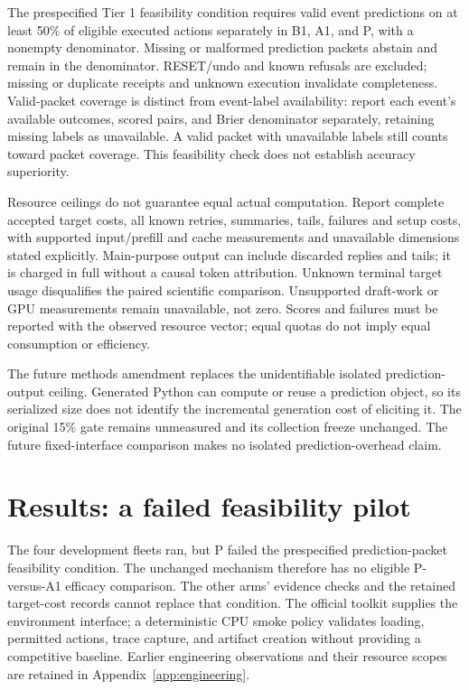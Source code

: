 \documentclass[11pt]{article}
\begin{document}
The prespecified Tier 1 feasibility condition requires valid event predictions on at least 50\% of eligible executed actions separately in B1, A1, and P, with a nonempty denominator. Missing or malformed prediction packets abstain and remain in the denominator. RESET/undo and known refusals are excluded; missing or duplicate receipts and unknown execution invalidate completeness. Valid-packet coverage is distinct from event-label availability: report each event's available outcomes, scored pairs, and Brier denominator separately, retaining missing labels as unavailable. A valid packet with unavailable labels still counts toward packet coverage. This feasibility check does not establish accuracy superiority.

Resource ceilings do not guarantee equal actual computation. Report complete accepted target costs, all known retries, summaries, tails, failures and setup costs, with supported input/prefill and cache measurements and unavailable dimensions stated explicitly. Main-purpose output can include discarded replies and tails; it is charged in full without a causal token attribution. Unknown terminal target usage disqualifies the paired scientific comparison. Unsupported draft-work or GPU measurements remain unavailable, not zero. Scores and failures must be reported with the observed resource vector; equal quotas do not imply equal consumption or efficiency.

The future methods amendment replaces the unidentifiable isolated prediction-output ceiling. Generated Python can compute or reuse a prediction object, so its serialized size does not identify the incremental generation cost of eliciting it. The original 15\% gate remains unmeasured and its collection freeze unchanged. The future fixed-interface comparison makes no isolated prediction-overhead claim.

\section{Results: a failed feasibility pilot}
The four development fleets ran, but P failed the prespecified prediction-packet feasibility condition. The unchanged mechanism therefore has no eligible P-versus-A1 efficacy comparison. The other arms' evidence checks and the retained target-cost records cannot replace that condition. The official toolkit\cite{sdk} supplies the environment interface; a deterministic CPU smoke policy validates loading, permitted actions, trace capture, and artifact creation without providing a competitive baseline. Earlier engineering observations and their resource scopes are retained in Appendix~\ref{app:engineering}.
\end{document}
